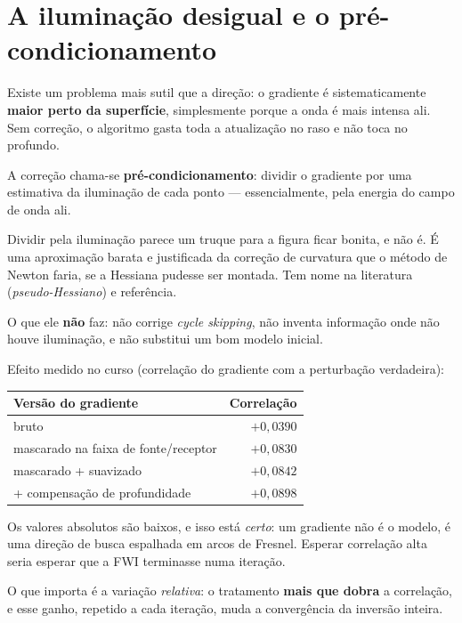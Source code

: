 \documentclass[11pt,a4paper,oneside]{report}
\begin{document}
\section{A ilumina\c{c}\~ao desigual e o pr\'e-condicionamento}

Existe um problema mais sutil que a dire\c{c}\~ao: o gradiente \'e
sistematicamente \textbf{maior perto da superf\'icie}, simplesmente porque a
onda \'e mais intensa ali. Sem corre\c{c}\~ao, o algoritmo gasta toda a
atualiza\c{c}\~ao no raso e n\~ao toca no profundo.

A corre\c{c}\~ao chama-se \textbf{pr\'e-condicionamento}: dividir o gradiente
por uma estimativa da ilumina\c{c}\~ao de cada ponto --- essencialmente, pela
energia do campo de onda ali.

\begin{teoria}
Dividir pela ilumina\c{c}\~ao parece um truque para a figura ficar bonita, e
n\~ao \'e. \'E uma aproxima\c{c}\~ao barata e justificada da corre\c{c}\~ao de
curvatura que o m\'etodo de Newton faria, se a Hessiana pudesse ser montada.
Tem nome na literatura (\emph{pseudo-Hessiano}) e refer\^encia.

O que ele \textbf{n\~ao} faz: n\~ao corrige \emph{cycle skipping}, n\~ao
inventa informa\c{c}\~ao onde n\~ao houve ilumina\c{c}\~ao, e n\~ao substitui
um bom modelo inicial.
\end{teoria}

Efeito medido no curso (correla\c{c}\~ao do gradiente com a perturba\c{c}\~ao
verdadeira):

\begin{center}
\begin{tabular}{@{}lr@{}}
\toprule
\textbf{Vers\~ao do gradiente} & \textbf{Correla\c{c}\~ao} \\
\midrule
bruto & $+0{,}0390$ \\
mascarado na faixa de fonte/receptor & $+0{,}0830$ \\
mascarado + suavizado & $+0{,}0842$ \\
+ compensa\c{c}\~ao de profundidade & $+0{,}0898$ \\
\bottomrule
\end{tabular}
\end{center}

\begin{atencao}
Os valores absolutos s\~ao baixos, e isso est\'a \emph{certo}: um gradiente
n\~ao \'e o modelo, \'e uma dire\c{c}\~ao de busca espalhada em arcos de
Fresnel. Esperar correla\c{c}\~ao alta seria esperar que a FWI terminasse numa
itera\c{c}\~ao.

O que importa \'e a varia\c{c}\~ao \emph{relativa}: o tratamento
\textbf{mais que dobra} a correla\c{c}\~ao, e esse ganho, repetido a cada
itera\c{c}\~ao, muda a converg\^encia da invers\~ao inteira.
\end{atencao}
\end{document}
